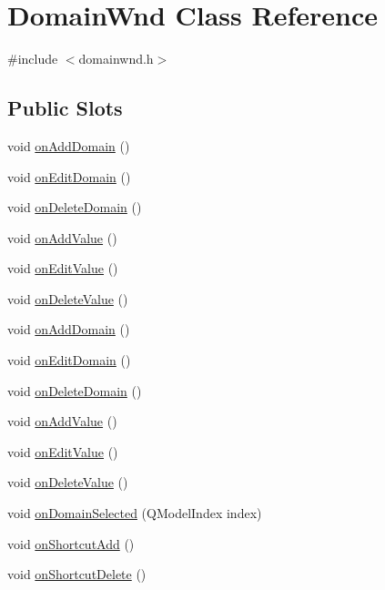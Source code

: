\hypertarget{class_domain_wnd}{
\section{DomainWnd Class Reference}
\label{class_domain_wnd}
}


{\ttfamily \#include $<$domainwnd.h$>$}

\subsection*{Public Slots}
\begin{DoxyCompactItemize}
\item 
void \hyperlink{class_domain_wnd_a3aa016423aaec2a32099969faf1322cd}{onAddDomain} ()
\item 
void \hyperlink{class_domain_wnd_aafb419e408567c2725302f7c0f696a25}{onEditDomain} ()
\item 
void \hyperlink{class_domain_wnd_aa20577445a46b501095d8972a8999901}{onDeleteDomain} ()
\item 
void \hyperlink{class_domain_wnd_ac589d9fd81ef4ea8420850a975b81f6a}{onAddValue} ()
\item 
void \hyperlink{class_domain_wnd_aef95efd55420445d8b160d27e6967e42}{onEditValue} ()
\item 
void \hyperlink{class_domain_wnd_a315941c78082d8a44a670bcb55de972f}{onDeleteValue} ()
\item 
void \hyperlink{class_domain_wnd_a3aa016423aaec2a32099969faf1322cd}{onAddDomain} ()
\item 
void \hyperlink{class_domain_wnd_aafb419e408567c2725302f7c0f696a25}{onEditDomain} ()
\item 
void \hyperlink{class_domain_wnd_aa20577445a46b501095d8972a8999901}{onDeleteDomain} ()
\item 
void \hyperlink{class_domain_wnd_ac589d9fd81ef4ea8420850a975b81f6a}{onAddValue} ()
\item 
void \hyperlink{class_domain_wnd_aef95efd55420445d8b160d27e6967e42}{onEditValue} ()
\item 
void \hyperlink{class_domain_wnd_a315941c78082d8a44a670bcb55de972f}{onDeleteValue} ()
\item 
void \hyperlink{class_domain_wnd_a91c13e562f3f80ae1f8177a83d2e5f27}{onDomainSelected} (QModelIndex index)
\item 
void \hyperlink{class_domain_wnd_a4d8381ab52c1196d34565d58536f23f0}{onShortcutAdd} ()
\item 
void \hyperlink{class_domain_wnd_a9ca370e771d751c4c633b6a9fe800efb}{onShortcutDelete} ()

\end{DoxyCompactItemize}
